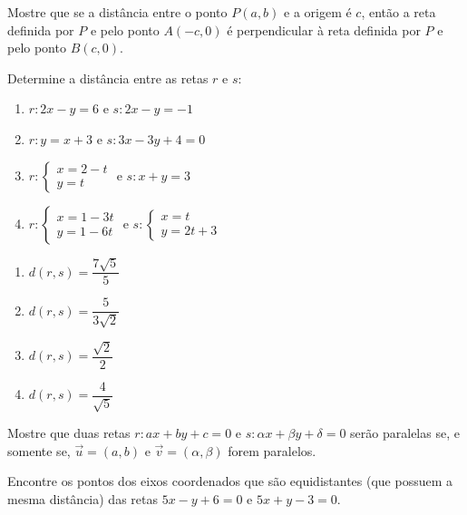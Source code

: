 \documentclass[12pt]{exam}
\begin{document}
\vspace{.3cm}
\questao{} Mostre que se a distância entre o ponto $P(a,b)$ e a origem é $c$, então a reta definida por $P$ e pelo ponto $A(-c, 0)$ é perpendicular à reta definida por $P$ e pelo ponto $B(c, 0)$.

\vspace{.3cm}

\questao{} Determine a distância entre as retas $r$ e $s$:
\begin{enumerate}[label=({\alph*})]
    \item $r: 2x - y = 6$ e $s: 2x -y = -1$
    \item $r: y = x + 3$ e $s: 3x - 3y + 4 = 0$
    \item $r: \begin{cases}x = 2 - t\\y = t\end{cases}$ e $s: x + y = 3$
    \item $r: \begin{cases}x = 1 - 3t\\y = 1 - 6t\end{cases}$ e $s: \begin{cases}x = t\\y = 2t + 3\end{cases}$
\end{enumerate}
\begin{solucao}
    \begin{enumerate}[label=({\alph*})]
        \item $d(r,s) = \dfrac{7\sqrt{5}}{5}$
        \item $d(r,s) = \dfrac{5}{3\sqrt{2}}$
        \item $d(r,s) = \dfrac{\sqrt{2}}{2}$
        \item $d(r,s) = \dfrac{4}{\sqrt{5}}$
    \end{enumerate}
\end{solucao}

\vspace{.3cm}

\questao{} Mostre que duas retas $r: ax + by + c = 0$ e $s : \alpha x + \beta y + \delta = 0$ serão paralelas se, e somente se, $\vec{u} = (a, b)$ e $\vec{v} = (\alpha, \beta)$ forem paralelos.

\vspace{.3cm}

\questao{} Encontre os pontos dos eixos coordenados que são equidistantes (que possuem a mesma distância) das retas $5x -y + 6 = 0$ e $5x + y - 3 = 0$.
\end{document}
